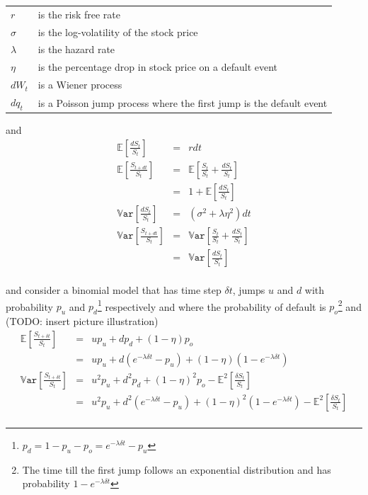 \documentclass[a4paper,11pt,oneside]{report}
\theoremstyle{plain}
\theoremstyle{definition}
\def\E{\mathbb{E}}
\def\Var{\mathbb{V}\mathtt{ar}}
\def\S{\ensuremath{S_t}\xspace}
\def\dS{\ensuremath{dS_t}\xspace}
\def\dt{\ensuremath{dt}\xspace}
\def\dW{\ensuremath{dW_t}\xspace}
\def\dq{\ensuremath{dq_t}\xspace}
\def\DS{\ensuremath{\delta S_t}\xspace}
\def\Dt{\ensuremath{\delta t}\xspace}
\def\u{\ensuremath{u}\xspace}
\def\d{\ensuremath{d}\xspace}
\def\o{\ensuremath{o}\xspace}
\def\pu{\ensuremath{p_\u}\xspace}
\def\pd{\ensuremath{p_\d}\xspace}
\def\po{\ensuremath{p_\o}\xspace}
\begin{document}
\begin{tabular}{ll}
 $r$            & is the risk free rate \\
 $\sigma$       & is the log-volatility of the stock price \\
 $\lambda$      & is the hazard rate \\
 $\eta$         & is the percentage drop in stock price on a default event \\
 \dW            & is a Wiener process \\
 \dq            & is a Poisson jump process where the first jump is the default event \\
\end{tabular}

\noindent and
\begin{displaymath}\begin{array}{rcl}
 \E[\frac{\dS}{\S}]     &=& r\dt \\
 \E[\frac{S_{t + \dt}}{\S}] &=& \E[\frac{\S}{\S} + \frac{\dS}{\S}] \\
                        &=& 1 + \E[\frac{\dS}{\S}] \\
 \Var[\frac{\dS}{\S}]   &=& (\sigma^2 + \lambda\eta^2)\dt \\
 \Var[\frac{S_{t + \dt}}{\S}] &=& \Var[\frac{\S}{\S} + \frac{\dS}{\S}] \\
                        &=& \Var[\frac{\dS}{\S}] \\
\end{array}\end{displaymath}

\noindent and consider a binomial model that has time step \Dt, jumps \u and \d with probability \pu and \pd\footnote{$\pd = 1 - \pu - \po = e^{-\lambda\Dt} - \pu$} respectively and where the probability of default is \po\footnote{The time till the first jump follows an exponential distribution and has probability $1 - e^{-\lambda\Dt}$} and (TODO: insert picture illustration)
\begin{displaymath}\begin{array}{rcl}
 \E[\frac{S_{t + \Dt}}{\S}]     &=& \u\pu + \d\pd + (1 - \eta)\po \\
                                &=& \u\pu + \d(e^{-\lambda\Dt} - \pu) + (1 - \eta)(1 - e^{-\lambda\Dt}) \\
 \Var[\frac{S_{t + \Dt}}{\S}]   &=& \u^2\pu + \d^2\pd + (1 - \eta)^2\po - \E^2[\frac{\DS}{\S}] \\
                                &=& \u^2\pu + \d^2(e^{-\lambda\Dt} - \pu) + (1 - \eta)^2(1 - e^{-\lambda\Dt}) - \E^2[\frac{\DS}{\S}] \\
\end{array}\end{displaymath}
\end{document}
